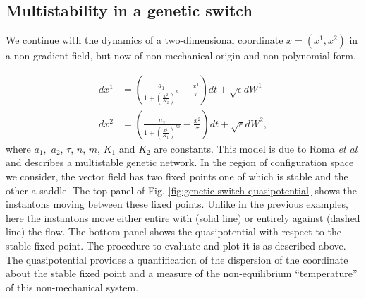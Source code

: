 \subsection{Multistability in a genetic switch}

We continue with the dynamics of a two-dimensional coordinate $x=(x^{1},x^{2})$
in a non-gradient field, but now of non-mechanical origin and non-polynomial
form,

\begin{equation}
\begin{aligned}dx^{1} & =\left(\frac{a_{1}}{1+\left(\frac{x^{2}}{K_{2}}\right)^{n}}-\frac{x^{1}}{\tau}\right)dt+\sqrt{\epsilon}dW^{1}\\
dx^{2} & =\left(\frac{a_{2}}{1+\left(\frac{x^{1}}{K_{1}}\right)^{m}}-\frac{x^{2}}{\tau}\right)dt+\sqrt{\epsilon}dW^{2},
\end{aligned}
\label{eq:genetic-switch}
\end{equation}
where $a_{1},$ $a_{2}$, $\tau$, $n$, $m$, $K_{1}$ and $K_{2}$
are constants. This model is due to Roma \emph{et al} \citep{roma2005optimal}
and describes a multistable genetic network. In the region of configuration
space we consider, the vector field has two fixed points one of which
is stable and the other a saddle. The top panel of Fig. \ref{fig:genetic-switch-quasipotential}
shows the instantons moving between these fixed points. Unlike in
the previous examples, here the instantons move either entire with
(solid line) or entirely against (dashed line) the flow. The bottom
panel shows the quasipotential with respect to the stable fixed point.
The procedure to evaluate and plot it is as described above. The quasipotential
provides a quantification of the dispersion of the coordinate about
the stable fixed point and a measure of the non-equilibrium ``temperature''
of this non-mechanical system. 

